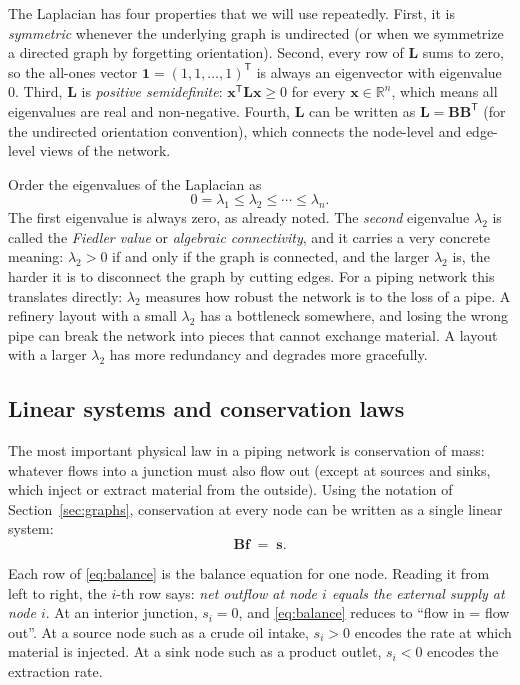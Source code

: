 \documentclass[11pt,a4paper]{article}
\newcommand{\RR}{\mathbb{R}}
\newcommand{\mat}[1]{\mathbf{#1}}
\newcommand{\vect}[1]{\mathbf{#1}}
\newcommand{\transpose}{^{\mathsf{T}}}
\begin{document}
The Laplacian has four properties that we will use repeatedly.
First, it is \emph{symmetric} whenever the underlying graph is
undirected (or when we symmetrize a directed graph by forgetting
orientation). Second, every row of $\mat{L}$ sums to zero, so the
all-ones vector $\vect{1} = (1, 1, \ldots, 1)\transpose$ is always an
eigenvector with eigenvalue $0$. Third, $\mat{L}$ is \emph{positive
semidefinite}: $\vect{x}\transpose \mat{L} \vect{x} \ge 0$ for every
$\vect{x} \in \RR^{n}$, which means all eigenvalues are real and
non-negative. Fourth, $\mat{L}$ can be written as
$\mat{L} = \mat{B}\mat{B}\transpose$ (for the undirected orientation
convention), which connects the node-level and edge-level views of the
network.

Order the eigenvalues of the Laplacian as
\[
0 = \lambda_1 \le \lambda_2 \le \cdots \le \lambda_n.
\]
The first eigenvalue is always zero, as already noted. The
\emph{second} eigenvalue $\lambda_2$ is called the \emph{Fiedler value}
or \emph{algebraic connectivity}, and it carries a very concrete
meaning: $\lambda_2 > 0$ if and only if the graph is connected, and
the larger $\lambda_2$ is, the harder it is to disconnect the graph
by cutting edges. For a piping network this translates directly:
$\lambda_2$ measures how robust the network is to the loss of a pipe.
A refinery layout with a small $\lambda_2$ has a bottleneck somewhere,
and losing the wrong pipe can break the network into pieces that
cannot exchange material. A layout with a larger $\lambda_2$ has more
redundancy and degrades more gracefully.

\subsection{Linear systems and conservation laws}
\label{sec:conservation}

The most important physical law in a piping network is conservation
of mass: whatever flows into a junction must also flow out (except at
sources and sinks, which inject or extract material from the outside).
Using the notation of Section~\ref{sec:graphs}, conservation at every
node can be written as a single linear system:
\begin{equation}
  \mat{B}\vect{f} \;=\; \vect{s}.
  \label{eq:balance}
\end{equation}

Each row of \eqref{eq:balance} is the balance equation for one node.
Reading it from left to right, the $i$-th row says: \emph{net outflow
at node $i$ equals the external supply at node $i$}. At an interior
junction, $s_i = 0$, and \eqref{eq:balance} reduces to ``flow in =
flow out''. At a source node such as a crude oil intake, $s_i > 0$
encodes the rate at which material is injected. At a sink node such
as a product outlet, $s_i < 0$ encodes the extraction rate.
\end{document}
